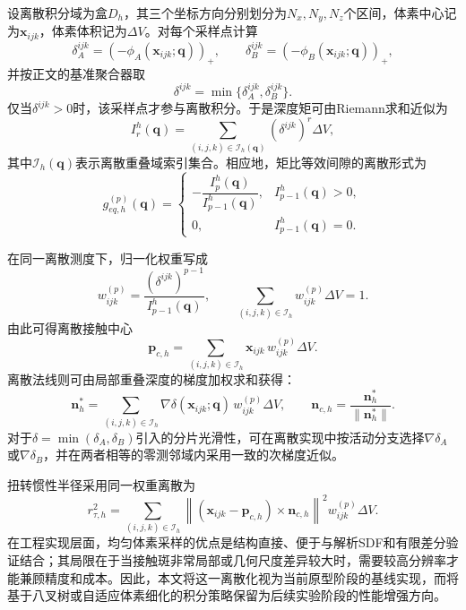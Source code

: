 ﻿\documentclass[12pt, a4paper]{ctexart}
\theoremstyle{plain}
\theoremstyle{remark}
\begin{document}
设离散积分域为盒$D_h$，其三个坐标方向分别划分为$N_x,N_y,N_z$个区间，体素中心记为$\bm{x}_{ijk}$，体素体积记为$\Delta V$。对每个采样点计算
\begin{equation}
    \delta_A^{ijk} = (-\phi_A(\bm{x}_{ijk};\bm{q}))_+, \qquad
    \delta_B^{ijk} = (-\phi_B(\bm{x}_{ijk};\bm{q}))_+,
\end{equation}
并按正文的基准聚合器取
\begin{equation}
    \delta^{ijk} = \min\{\delta_A^{ijk}, \delta_B^{ijk}\}.
\end{equation}
仅当$\delta^{ijk} > 0$时，该采样点才参与离散积分。于是深度矩可由Riemann求和近似为
\begin{equation}
    I_r^h(\bm{q}) = \sum_{(i,j,k)\in \mathcal{I}_h(\bm{q})} \left(\delta^{ijk}\right)^r \Delta V,
\end{equation}
其中$\mathcal{I}_h(\bm{q})$表示离散重叠域索引集合。相应地，矩比等效间隙的离散形式为
\begin{equation}
    g_{eq,h}^{(p)}(\bm{q}) =
    \begin{cases}
        -\dfrac{I_p^h(\bm{q})}{I_{p-1}^h(\bm{q})}, & I_{p-1}^h(\bm{q}) > 0, \\
        0, & I_{p-1}^h(\bm{q}) = 0 .
    \end{cases}
\end{equation}

在同一离散测度下，归一化权重写成
\begin{equation}
    w_{ijk}^{(p)} = \frac{\left(\delta^{ijk}\right)^{p-1}}{I_{p-1}^h(\bm{q})},
    \qquad
    \sum_{(i,j,k)\in \mathcal{I}_h} w_{ijk}^{(p)} \Delta V = 1 .
\end{equation}
由此可得离散接触中心
\begin{equation}
    \bm{p}_{c,h} = \sum_{(i,j,k)\in \mathcal{I}_h} \bm{x}_{ijk} \, w_{ijk}^{(p)} \Delta V .
\end{equation}
离散法线则可由局部重叠深度的梯度加权求和获得：
\begin{equation}
    \bm{n}_h^\ast = \sum_{(i,j,k)\in \mathcal{I}_h} \nabla \delta(\bm{x}_{ijk};\bm{q}) \, w_{ijk}^{(p)} \Delta V,
    \qquad
    \bm{n}_{c,h} = \frac{\bm{n}_h^\ast}{\|\bm{n}_h^\ast\|}.
\end{equation}
对于$\delta = \min(\delta_A,\delta_B)$引入的分片光滑性，可在离散实现中按活动分支选择$\nabla \delta_A$或$\nabla \delta_B$，并在两者相等的零测邻域内采用一致的次梯度近似。

扭转惯性半径采用同一权重离散为
\begin{equation}
    r_{\tau,h}^2 =
    \sum_{(i,j,k)\in \mathcal{I}_h}
    \left\|(\bm{x}_{ijk}-\bm{p}_{c,h}) \times \bm{n}_{c,h}\right\|^2
    w_{ijk}^{(p)} \Delta V .
\end{equation}
在工程实现层面，均匀体素采样的优点是结构直接、便于与解析SDF和有限差分验证结合；其局限在于当接触斑非常局部或几何尺度差异较大时，需要较高分辨率才能兼顾精度和成本。因此，本文将这一离散化视为当前原型阶段的基线实现，而将基于八叉树或自适应体素细化的积分策略保留为后续实验阶段的性能增强方向。
\end{document}
